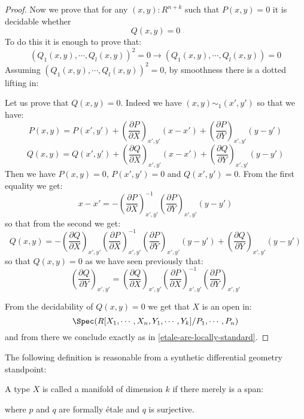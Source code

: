 \begin{proof}
Now we prove that for any $(x,y):R^{n+k}$ such that $P(x,y)=0$ it is decidable whether
\[Q(x,y)=0 \] 
To do this it is enough to prove that:
\[(Q_1(x,y),\cdots,Q_l(x,y))^2=0 \to (Q_1(x,y),\cdots,Q_l(x,y))=0\]
Assuming $(Q_1(x,y),\cdots,Q_l(x,y))^2=0$, by smoothness there is a dotted lifting in:
 \begin{center}
\end{center}
Let us prove that $Q(x,y) = 0$. Indeed we have $(x,y) \sim_1 (x',y')$ so that we have:
\[P(x,y) = P(x',y')+ \left(\frac{\partial P}{\partial X}\right)_{x',y'}(x-x') + \left(\frac{\partial P}{\partial Y}\right)_{x',y'}(y-y') \]
\[Q(x,y) = Q(x',y')+ \left(\frac{\partial Q}{\partial X}\right)_{x',y'}(x-x') + \left(\frac{\partial Q}{\partial Y}\right)_{x',y'}(y-y') \]
Then we have $P(x,y) = 0$, $P(x',y')=0$ and $Q(x',y') = 0$. From the first equality we get:
\[x-x' =  -\left(\frac{\partial P}{\partial X}\right)_{x',y'}^{-1}\left(\frac{\partial P}{\partial Y}\right)_{x',y'}(y-y')\]
so that from the second we get:
\[Q(x,y) = -\left(\frac{\partial Q}{\partial X}\right)_{x',y'}\left(\frac{\partial P}{\partial X}\right)_{x',y'}^{-1}\left(\frac{\partial P}{\partial Y}\right)_{x',y'}(y-y') + \left(\frac{\partial Q}{\partial Y}\right)_{x',y'}(y-y')\]
so that $Q(x,y)=0$ as we have seen previously that:
\[\left(\frac{\partial Q}{\partial Y}\right)_{x',y'} = \left(\frac{\partial Q}{\partial X}\right)_{x',y'}\left(\frac{\partial P}{\partial X}\right)_{x',y'}^{-1} \left(\frac{\partial P}{\partial Y}\right)_{x',y'} \]

From the decidability of $Q(x,y)=0$ we get that $X$ is an open in:
\[\Spec(R[X_1,\cdots,X_n,Y_1,\cdots,Y_k]/P_1,\cdots,P_n)\]
and from there we conclude exactly as in \cref{etale-are-locally-standard}.
\end{proof}

The following definition is reasonable from a synthetic differential geometry standpoint:

\begin{definition}
A type $X$ is called a manifold of dimension $k$ if there merely is a span:
 \begin{center}
\end{center}
where $p$ and $q$ are formally étale and $q$ is surjective.
\end{definition}

